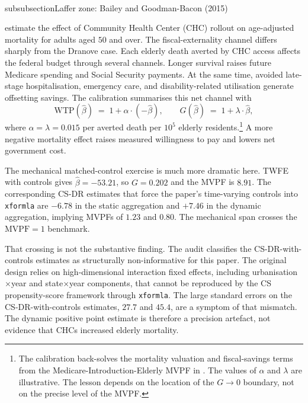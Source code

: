 \documentclass[11pt]{article}
\begin{document}
\clearpage
\\subsubsection{Laffer zone: Bailey and Goodman-Bacon (2015)}
\label{sec:mvpf_laffer}

\textcite{bailey2015war} estimate the effect of Community Health Center (CHC) rollout on age-adjusted mortality for adults aged \(50\) and over. The fiscal-externality channel differs sharply from the Dranove case. Each elderly death averted by CHC access affects the federal budget through several channels. Longer survival raises future Medicare spending and Social Security payments. At the same time, avoided late-stage hospitalisation, emergency care, and disability-related utilisation generate offsetting savings. The calibration summarises this net channel with
\begin{equation*}
\mathrm{WTP}(\hat\beta) \;=\; 1 + \alpha\cdot(-\hat\beta), \qquad G(\hat\beta) \;=\; 1 + \lambda\cdot\hat\beta,
\end{equation*}
where \(\alpha=\lambda=0.015\) per averted death per \(10^5\) elderly residents.\footnote{The calibration back-solves the mortality valuation and fiscal-savings terms from the Medicare-Introduction-Elderly MVPF in \textcite{hendren2020unified}. The values of \(\alpha\) and \(\lambda\) are illustrative. The lesson depends on the location of the \(G\to0\) boundary, not on the precise level of the MVPF.} A more negative mortality effect raises measured willingness to pay and lowers net government cost.

The mechanical matched-control exercise is much more dramatic here. TWFE with controls gives \(\hat\beta=-53.21\), so \(G=0.202\) and the MVPF is \(8.91\). The corresponding CS-DR estimates that force the paper's time-varying controls into \texttt{xformla} are \(-6.78\) in the static aggregation and \(+7.46\) in the dynamic aggregation, implying MVPFs of \(1.23\) and \(0.80\). The mechanical span crosses the \(\mathrm{MVPF}=1\) benchmark.

That crossing is not the substantive finding. The audit classifies the CS-DR-with-controls estimates as structurally non-informative for this paper. The original design relies on high-dimensional interaction fixed effects, including urbanisation\(\times\)year and state\(\times\)year components, that cannot be reproduced by the CS propensity-score framework through \texttt{xformla}. The large standard errors on the CS-DR-with-controls estimates, \(27.7\) and \(45.4\), are a symptom of that mismatch. The dynamic positive point estimate is therefore a precision artefact, not evidence that CHCs increased elderly mortality.
\end{document}
